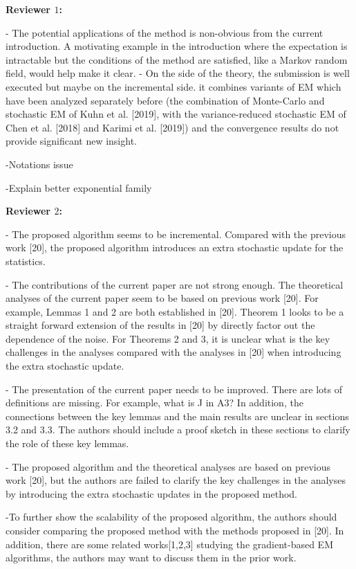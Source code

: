 \documentclass{article}
\begin{document}
\textbf{Reviewer $1$:}

- The potential applications of the method is non-obvious from the current introduction. A motivating example in the introduction where the expectation is intractable but the conditions of the method are satisfied, like a Markov random field, would help make it clear. 
- On the side of the theory, the submission is well executed but maybe on the incremental side. it combines variants of EM which have been analyzed separately before (the combination of Monte-Carlo and stochastic EM of Kuhn et al. [2019], with the variance-reduced stochastic EM of Chen et al. [2018] and Karimi et al. [2019]) and the convergence results do not provide significant new insight.

-Notations issue

-Explain better exponential family

\textbf{Reviewer $2$:}

- The proposed algorithm seems to be incremental. Compared with the previous work [20], the proposed algorithm introduces an extra stochastic update for the statistics. 

- The contributions of the current paper are not strong enough. The theoretical analyses of the current paper seem to be based on previous work [20]. For example, Lemmas 1 and 2 are both established in [20]. Theorem 1 looks to be a straight forward extension of the results in [20] by directly factor out the dependence of the noise. For Theorems 2 and 3, it is unclear what is the key challenges in the analyses compared with the analyses in [20] when introducing the extra stochastic update. 

- The presentation of the current paper needs to be improved. There are lots of definitions are missing. For example, what is J in A3? In addition, the connections between the key lemmas and the main results are unclear in sections 3.2 and 3.3. The authors should include a proof sketch in these sections to clarify the role of these key lemmas.

- The proposed algorithm and the theoretical analyses are based on previous work [20], but the authors are failed to clarify the key challenges in the analyses by introducing the extra stochastic updates in the proposed method.

-To further show the scalability of the proposed algorithm, the authors should consider comparing the proposed method with the methods proposed in [20]. In addition, there are some related works[1,2,3] studying the gradient-based EM algorithms, the authors may want to discuss them in the prior work.
\end{document}
